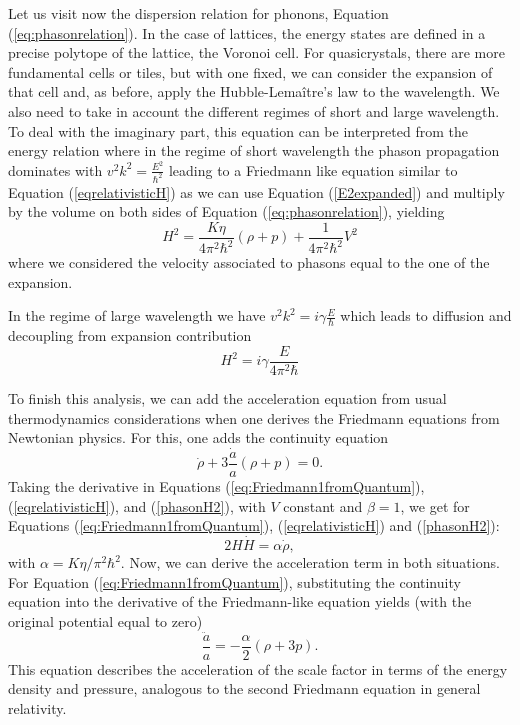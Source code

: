 \documentclass[sn-mathphys-num]{sn-jnl}%
\begin{document}
Let us visit now the dispersion relation for phonons, Equation (\ref{eq:phasonrelation}). In the case of lattices, the energy states are defined in a precise polytope of the lattice, the Voronoi cell. For quasicrystals, there are more fundamental cells or tiles, but with one fixed, we can consider the expansion of that cell and, as before, apply the Hubble-Lemaître's law to the wavelength. We also need to take in account the different regimes of short and large wavelength. 
To deal with the imaginary part, this equation can be interpreted from the energy relation where in the regime of short wavelength the phason propagation dominates with $v^{2}k^{2}=\frac{E^{2}}{\hbar^{2}}$ leading to a Friedmann like equation similar to Equation (\ref{eqrelativisticH}) as we can use Equation (\ref{E2expanded}) and multiply by the volume on both sides of Equation (\ref{eq:phasonrelation}), yielding 
\begin{equation}
H^{2}=\frac{K\eta}{4\pi^{2}\hbar^{2}}(\rho+p)+\frac{1}{4\pi^{2}\hbar^{2}}V^{2} \label{phasonH2}
\end{equation}
where we considered the velocity associated to phasons equal to the one of the expansion. 

In the regime of large wavelength we have $v^{2}k^{2}=i\gamma\frac{E}{\hbar}$ which leads to diffusion and decoupling from expansion contribution
\begin{equation}
H^{2}=i\gamma\frac{E}{4\pi^{2}\hbar} \label{phasonHimaginary}
\end{equation}




To finish this analysis, we can add the acceleration equation from usual thermodynamics considerations when one derives the Friedmann equations from Newtonian physics. For this, one adds the continuity equation
\begin{equation}
\dot{\rho} + 3 \frac{\dot{a}}{a} (\rho + p) = 0.
\end{equation}
Taking the derivative in Equations (\ref{eq:Friedmann1fromQuantum}), (\ref{eqrelativisticH}), and (\ref{phasonH2}), with $V$ constant and $\beta=1$, we get for Equations (\ref{eq:Friedmann1fromQuantum}), (\ref{eqrelativisticH}) and (\ref{phasonH2}):
\begin{equation}
2H \dot{H} = \alpha \dot{\rho},
\end{equation}
with $\alpha = K\eta/\pi^2 \hbar^2$. 
Now, we can derive the acceleration term in both situations. For Equation (\ref{eq:Friedmann1fromQuantum}), substituting the continuity equation into the derivative of the Friedmann-like equation yields (with the original potential equal to zero)
\begin{equation}
\frac{\ddot{a}}{a} = -\frac{\alpha}{2} (\rho + 3p).
\end{equation}
This equation describes the acceleration of the scale factor in terms of the energy density and pressure, analogous to the second Friedmann equation in general relativity.
\end{document}
